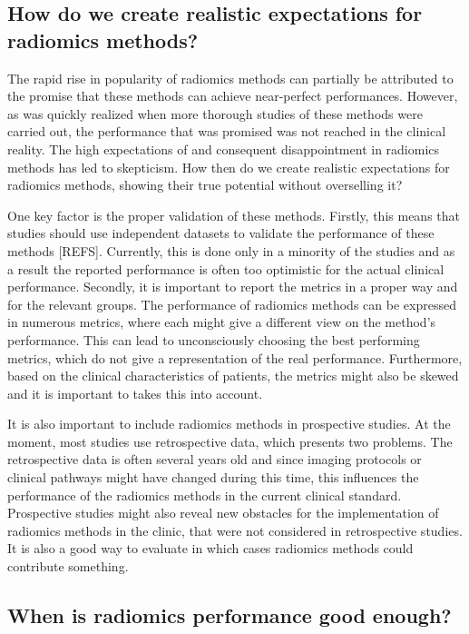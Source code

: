 \subsection{How do we create realistic expectations for radiomics methods?}

The rapid rise in popularity of radiomics methods can partially be attributed to the promise that these methods can achieve near-perfect performances.
However, as was quickly realized when more thorough studies of these methods were carried out, the performance that was promised was not reached in the clinical reality.
The high expectations of and consequent disappointment in  radiomics methods has led to skepticism.
How then do we create realistic expectations for radiomics methods, showing their true potential without overselling it?

One key factor is the proper validation of these methods.
Firstly, this means that studies should use independent datasets to validate the performance of these methods [REFS].
Currently, this is done only in a minority of the studies and as a result the reported performance is often too optimistic for the actual clinical performance.
Secondly, it is important to report the metrics in a proper way and for the relevant groups.
The performance of radiomics methods can be expressed in numerous metrics, where each might give a different view on the method's performance.
This can lead to unconsciously choosing the best performing metrics, which do not give a representation of the real performance.
Furthermore, based on the clinical characteristics of patients, the metrics might also be skewed and it is important to takes this into account.

It is also important to include radiomics methods in prospective studies.
At the moment, most studies use retrospective data, which presents two problems.
The retrospective data is often several years old and since imaging protocols or clinical pathways might have changed during this time, this influences the performance of the radiomics methods in the current clinical standard.
Prospective studies might also reveal new obstacles for the implementation of radiomics methods in the clinic, that were not considered in retrospective studies.
It is also a good way to evaluate in which cases radiomics methods could contribute something.

\subsection{When is radiomics performance good enough?}\label{subsec:discussion_radiomics_performance}


